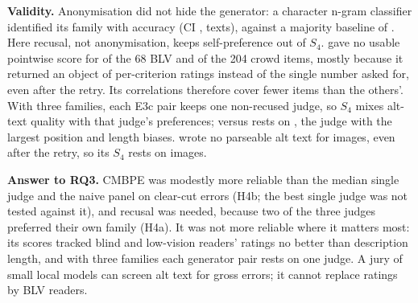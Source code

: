 \textbf{Validity.} Anonymisation did not hide the generator: a character n-gram classifier
identified its family with accuracy  (CI
,  texts), against a majority baseline of . Here
recusal, not anonymisation, keeps self-preference out of $S_4$. \MI{} gave no usable pointwise
score for  of the 68 BLV and
 of the 204 crowd items, mostly because it returned an
object of per-criterion ratings instead of the single number asked for, even after the retry.
Its correlations therefore cover fewer items than the others'. With three families, each E3c
pair keeps one non-recused judge, so $S_4$ mixes alt-text quality with that judge's preferences;
\MI{} versus \QV{} rests on \GM{}, the judge with the largest position and length
biases. \GM{} wrote no parseable alt text for  images,
even after the retry, so its $S_4$ rests on  images.

\textbf{Answer to RQ3.} CMBPE was modestly more reliable than the median single judge and the naive
panel on clear-cut errors (H4b; the best single judge was not tested against it), and recusal was needed, because two of the three judges preferred their
own family (H4a). It was not more reliable where it matters most: its scores tracked blind and
low-vision readers' ratings no better than description length, and with three families each
generator pair rests on one judge. A jury of small local models can screen alt text for gross
errors; it cannot replace ratings by BLV readers.

